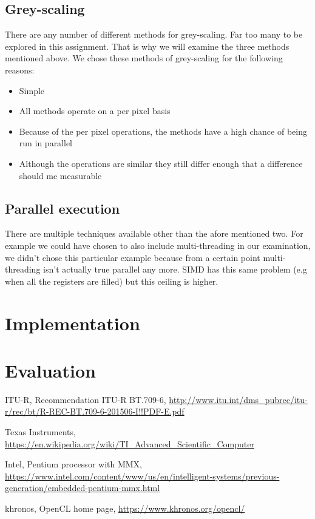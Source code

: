 \documentclass[a4paper]{article}
\begin{document}
\subsection{Grey-scaling}
There are any number of different methods for grey-scaling. Far too many to be explored in this assignment. That is why we will examine the three methods mentioned above.
We chose these methods of grey-scaling for the following reasons:

\begin{itemize}
\item Simple
\item All methods operate on a per pixel basis
\item Because of the per pixel operations, the methods have a high chance of being run in parallel
\item Although the operations are similar they still differ enough that a difference should me measurable
\end{itemize}

\subsection{Parallel execution}
There are multiple techniques available other than the afore mentioned two. For example we could have chosen to also include multi-threading in our examination, we didn't chose this particular example because from a certain point multi-threading isn't actually true parallel any more. SIMD has this same problem (e.g when all the registers are filled) but this ceiling is higher.

\section{Implementation}

\section{Evaluation}

\begin{thebibliography}{9}

	ITU-R,
	Recommendation  ITU-R  BT.709-6,	
	\url{http://www.itu.int/dms_pubrec/itu-r/rec/bt/R-REC-BT.709-6-201506-I!!PDF-E.pdf}
  
	Texas Instruments,
	\url{https://en.wikipedia.org/wiki/TI_Advanced_Scientific_Computer}
 
Intel,
Pentium processor with MMX,
\url{https://www.intel.com/content/www/us/en/intelligent-systems/previous-generation/embedded-pentium-mmx.html}

khronos,
OpenCL home page,
\url{https://www.khronos.org/opencl/}

\end{thebibliography}
\end{document}
